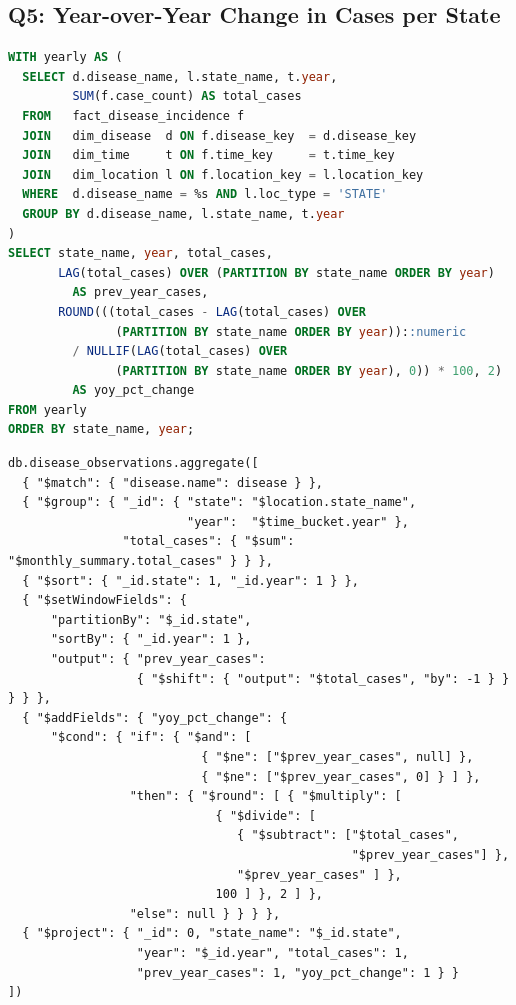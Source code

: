 \documentclass[12pt,a4paper]{article}
\begin{document}
\subsection*{Q5: Year-over-Year Change in Cases per State}

\begin{lstlisting}[language=SQL, caption={Q5: PostgreSQL. \texttt{LAG()} provides the previous year's value in-place.}]
WITH yearly AS (
  SELECT d.disease_name, l.state_name, t.year,
         SUM(f.case_count) AS total_cases
  FROM   fact_disease_incidence f
  JOIN   dim_disease  d ON f.disease_key  = d.disease_key
  JOIN   dim_time     t ON f.time_key     = t.time_key
  JOIN   dim_location l ON f.location_key = l.location_key
  WHERE  d.disease_name = %s AND l.loc_type = 'STATE'
  GROUP BY d.disease_name, l.state_name, t.year
)
SELECT state_name, year, total_cases,
       LAG(total_cases) OVER (PARTITION BY state_name ORDER BY year)
         AS prev_year_cases,
       ROUND(((total_cases - LAG(total_cases) OVER
               (PARTITION BY state_name ORDER BY year))::numeric
         / NULLIF(LAG(total_cases) OVER
               (PARTITION BY state_name ORDER BY year), 0)) * 100, 2)
         AS yoy_pct_change
FROM yearly
ORDER BY state_name, year;
\end{lstlisting}

\begin{lstlisting}[language={}, caption={Q5: MongoDB. \texttt{\$setWindowFields} with \texttt{\$shift} supplies the previous row.}]
db.disease_observations.aggregate([
  { "$match": { "disease.name": disease } },
  { "$group": { "_id": { "state": "$location.state_name",
                         "year":  "$time_bucket.year" },
                "total_cases": { "$sum": "$monthly_summary.total_cases" } } },
  { "$sort": { "_id.state": 1, "_id.year": 1 } },
  { "$setWindowFields": {
      "partitionBy": "$_id.state",
      "sortBy": { "_id.year": 1 },
      "output": { "prev_year_cases":
                  { "$shift": { "output": "$total_cases", "by": -1 } } } } },
  { "$addFields": { "yoy_pct_change": {
      "$cond": { "if": { "$and": [
                           { "$ne": ["$prev_year_cases", null] },
                           { "$ne": ["$prev_year_cases", 0] } ] },
                 "then": { "$round": [ { "$multiply": [
                             { "$divide": [
                                { "$subtract": ["$total_cases",
                                                "$prev_year_cases"] },
                                "$prev_year_cases" ] },
                             100 ] }, 2 ] },
                 "else": null } } } },
  { "$project": { "_id": 0, "state_name": "$_id.state",
                  "year": "$_id.year", "total_cases": 1,
                  "prev_year_cases": 1, "yoy_pct_change": 1 } }
])
\end{lstlisting}
\end{document}
